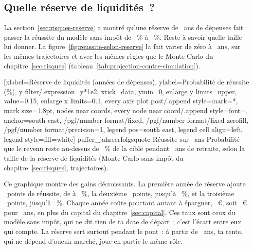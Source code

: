 \subsection{Quelle r\'eserve de liquidit\'es~?}\label{sec:retraite-reserve}

La section~\ref{sec:risques-reserve} a montr\'e qu'une r\'eserve de \PufferJahreMit~ans de d\'epenses
fait passer la r\'eussite du mod\`ele sans imp\^ot de \ErfolgsquoteBasis~\% \`a
\ErfolgsquoteMitPuffer~\%. Reste \`a savoir quelle taille lui donner. La
figure~\ref{fig:reussite-selon-reserve} la fait varier de z\'ero \`a \PufferJahreMax~ans, sur les m\^emes
trajectoires et avec les m\^emes r\`egles que le Monte Carlo du chapitre~\ref{sec:risques}
(tableau~\ref{tab:projection-contre-simulation}).


[xlabel={R\'eserve de liquidit\'es (ann\'ees de d\'epenses)},
  ylabel={Probabilit\'e de r\'eussite (\%)}, y filter/.expression={y*1e2}, xtick=data, ymin=0,
  enlarge y limits={upper, value=0.15}, enlarge x limits=0.1,
  every axis plot post/.append style={mark=*, mark size=1.8pt},
  nodes near coords, every node near coord/.append style={font=\scriptsize, anchor=south east,
    /pgf/number format/fixed, /pgf/number format/fixed zerofill, /pgf/number format/precision=1},
  legend pos=south east, legend cell align=left, legend style={fill=white}]%
  {puffer_jahre}{erfolgsquote}%
  {{R\'eussite sur \McRenteAns~ans}}%
  {Probabilit\'e que le revenu reste au-dessus de \SeuilReussite~\% de la cible pendant \McRenteAns~ans
  de retraite, selon la taille de la r\'eserve de liquidit\'es (Monte Carlo sans imp\^ot du
  chapitre~\ref{sec:risques}, \McTrajectoires{} trajectoires).\label{fig:reussite-selon-reserve}}

Ce graphique montre des gains d\'ecroissants. La premi\`ere ann\'ee de r\'eserve ajoute
\PufferGainEins~points de r\'eussite, de \ErfolgsquoteBasis{} \`a \ErfolgsquotePufferEins~\%, la
deuxi\`eme \PufferGainMit~points, jusqu'\`a \ErfolgsquoteMitPuffer~\%, et la troisi\`eme
\PufferGainMax~points, jusqu'\`a \ErfolgsquotePufferMax~\%. Chaque ann\'ee co\^ute pourtant autant \`a
\'epargner, \ZielJahr~€, soit \PufferMontantMax~€ pour \PufferJahreMax~ans, en plus du capital du
chapitre~\ref{sec:capital}.  Ces taux sont ceux du
mod\`ele sans imp\^ot, qui ne dit rien de ta date de d\'epart~; c'est l'\'ecart entre eux qui compte.
La r\'eserve sert surtout pendant le pont~: \`a partir de \AgeLegal~ans, ta rente, qui ne d\'epend
d'aucun march\'e, joue en partie le m\^eme r\^ole.

